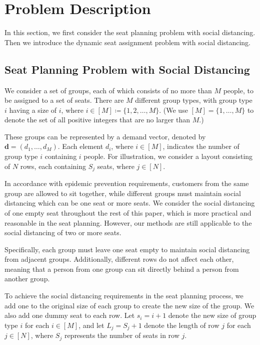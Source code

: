 \section{Problem Description}
In this section, we first consider the seat planning problem with social distancing. Then we introduce the dynamic seat assignment problem with social distancing.





\subsection{Seat Planning Problem with Social Distancing}\label{dynamic_demand}
We consider a set of groups, each of which consists of no more than $M$ people, to be assigned to a set of seats. There are $M$ different group types, with group type $i$ having a size of $i$, where $i \in [M] \coloneqq \{1,2, \ldots, M\}$. (We use $[M] = \{1, \ldots, M\}$ to denote the set of all positive integers that are no larger than $M$.)

These groups can be represented by a demand vector, denoted by $\mathbf{d} = (d_1, \ldots, d_M)$. Each element $d_i$, where $i \in [M]$, indicates the number of group type $i$ containing $i$ people. For illustration, we consider a layout consisting of $N$ rows, each containing $S_j$ seats, where $j \in [N]$.

In accordance with epidemic prevention requirements, customers from the same group are allowed to sit together, while different groups must maintain social distancing which can be one seat or more seats. We consider the social distancing of one empty seat throughout the rest of this paper, which is more practical and reasonable in the seat planning. However, our methods are still applicable to the social distancing of two or more seats.

Specifically, each group must leave one seat empty to maintain social distancing from adjacent groups. Additionally, different rows do not affect each other, meaning that a person from one group can sit directly behind a person from another group.

To achieve the social distancing requirements in the seat planning process, we add one to the original size of each group to create the new size of the group. We also add one dummy seat to each row. Let $s_i = i + 1$ denote the new size of group type $i$ for each $i \in [M]$, and let $L_j = S_j + 1$ denote the length of row $j$ for each $j \in [N]$, where $S_j$ represents the number of seats in row $j$.

